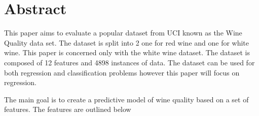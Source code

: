 \section{Abstract}

This paper aims to evaluate a popular dataset from UCI known as the Wine Quality data set. The dataset is split into 2 one for red wine and one for white wine. This paper is concerned only with the white wine dataset. The dataset is composed of 12 features and 4898 instances of data. The dataset can be used for both regression and classification problems however this paper will focus on regression.

The main goal is to create a predictive model of wine quality based on a set of features. The features are outlined below
